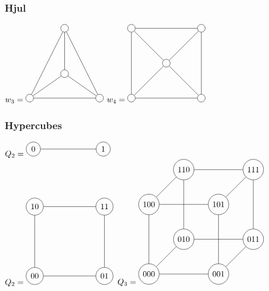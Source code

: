 \documentclass[12pt, a4paper]{article}
\begin{document}
			\subsubsection{Hjul}
				$w_3=\begin{tikzpicture}[scale=3]
					\tikzstyle{vertex}=[circle,draw=black]
					\node[vertex](v1) at (0,0){};
					\node[vertex](v2) at (1,0){};
					\node[vertex](v3) at (0.5,1){};
					\node[vertex](v4) at (0.5,0.35){};
					\path[-]
						(v1) edge node {}(v2)
						(v2) edge node {}(v3)
						(v3) edge node {}(v1)
						(v4) edge node {}(v1)
						(v4) edge node {}(v2)
						(v4) edge node {}(v3);
				\end{tikzpicture}$
				$w_4=\begin{tikzpicture}[scale=3]
					\tikzstyle{vertex}=[circle,draw=black]
					\node[vertex](v1) at (0,0){};
					\node[vertex](v2) at (1,0){};
					\node[vertex](v4) at (0,1){};
					\node[vertex](v3) at (1,1){};
					\node[vertex](v5) at (0.5,0.5){};
					\path[-]
						(v1) edge node {}(v2)
						(v2) edge node {}(v3)
						(v4) edge node {}(v1)
						(v3) edge node {}(v4)
						(v5) edge node {}(v1)
						(v5) edge node {}(v2)
						(v5) edge node {}(v3)
						(v5) edge node {}(v4);
				\end{tikzpicture}$\\
			\subsubsection{Hypercubes}
				$Q_2=\begin{tikzpicture}[scale=3]
					\tikzstyle{vertex}=[circle,draw=black]
					\node[vertex](v1) at (0,0) {0};
					\node[vertex](v2) at (1,0) {1};
					\path[-]
						(v1) edge node {}(v2);
				\end{tikzpicture}$\\
				$Q_2=\begin{tikzpicture}[scale=3]
					\tikzstyle{vertex}=[circle,draw=black]
					\node[vertex](v1) at (0,0) {00};
					\node[vertex](v2) at (1,0) {01};
					\node[vertex](v4) at (0,1) {10};
					\node[vertex](v3) at (1,1) {11};
					\path[-]
						(v1) edge node {}(v2)
						(v2) edge node {}(v3)
						(v4) edge node {}(v1)
						(v3) edge node {}(v4);
				\end{tikzpicture}$
				$Q_3=\begin{tikzpicture}[scale=3]
					\tikzstyle{vertex}=[circle,draw=black]
					\node[vertex](v1) at (0,0) {010};
					\node[vertex](v2) at (1,0) {011};
					\node[vertex](v4) at (0,1) {110};
					\node[vertex](v3) at (1,1) {111};
					\node[vertex](v5) at (0.5,-0.5) {001};
					\node[vertex](v6) at (-0.5,-0.5) {000};
					\node[vertex](v7) at (0.5,0.5) {101};
					\node[vertex](v8) at (-0.5,0.5) {100};
					\path[-]
						(v1) edge node {}(v2)
						(v2) edge node {}(v3)
						(v4) edge node {}(v1)
						(v3) edge node {}(v4)

						(v5) edge node {}(v7)
						(v6) edge node {}(v5)
						(v7) edge node {}(v8)
						(v8) edge node {}(v6)

						(v1) edge node {}(v6)
						(v2) edge node {}(v5)
						(v3) edge node {}(v7)
						(v4) edge node {}(v8);
				\end{tikzpicture}$\\
\end{document}
